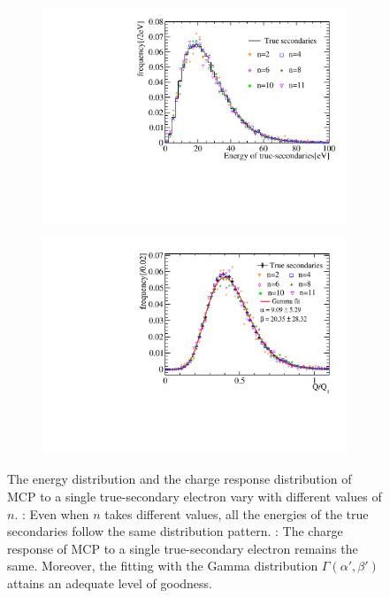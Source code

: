 \begin{figure}[!htbp]
	\centering
	\begin{subfigure}{0.47\textwidth}
		\centering
		\includegraphics[width=\linewidth]{PMTRelated/GTmodel/single_pecharge.pdf}
		\caption{}
		\label{fig:single_pe}
	\end{subfigure}
	\hfill
	\begin{subfigure}{0.47\textwidth}
		\centering
		\includegraphics[width=\linewidth]{PMTRelated/GTmodel/singlepefit.pdf}
		\caption{}
		\label{fig:single_fit}
	\end{subfigure}
	\caption{The energy distribution and the charge response distribution of MCP to a single true-secondary electron vary with different values of \(n\). : Even when \(n\) takes different values, all the energies of the true secondaries follow the same distribution pattern. : The charge response of MCP to a single true-secondary electron remains the same. Moreover, the fitting with the Gamma distribution \(\varGamma(\alpha',\beta')\) attains an adequate level of goodness. }
	\label{fig:singlepe}
\end{figure}

